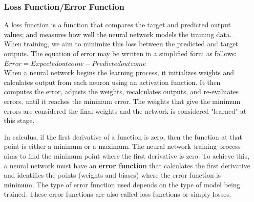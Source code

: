 \subsubsection{Loss Function/Error Function}
A loss function is a function that compares the target and predicted output values; and measures how well the neural network models the training data. When training, we aim to minimize this loss between the predicted and target outputs.
The equation of error may be written in a simplified form as follows:\\

\(Error = Expected outcome - Predicted outcome\)\\

When a neural network begins the learning process, it initializes weights and calculates output from each neuron using an activation function. It then computes the error, adjusts the weights, recalculates outputs, and re-evaluates errors, until it reaches the minimum error. The weights that give the minimum errors are considered the final weights and the network is considered "learned" at this stage.

In calculus, if the first derivative of a function is zero, then the function at that point is either a minimum or a maximum. The neural network training process aims to find the minimum point where the first derivative is zero. To achieve this, a neural network must have an \textbf{error function} that calculates the first derivative and identifies the points (weights and biases) where the error function is minimum. The type of error function used depends on the type of model being trained. These error functions are also called loss functions or simply losses.\\

